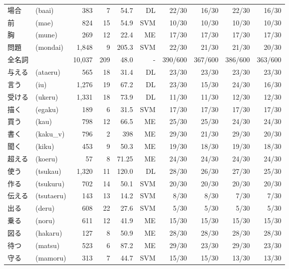 \begin{table*}[htbp]
\begin{center}
\begin{tabular}[c]{|l@{}l|r|r|r|r|@{ }r@{ }r|@{ }r@{ }r|}
      場合 & (baai) & 383 & 7 & 54.7 & DL 
      & 22/30 & 16/30 & 22/30 & 16/30 \\
      前 & (mae) & 824 & 15 & 54.9 & SVM
      & 10/30 & 10/30 & 10/30 & 10/30 \\
      胸 & (mune) & 269 & 12 & 22.4 & ME
      & 17/30 & 17/30 & 17/30 & 17/30 \\
      問題 & (mondai) & 1,848 & 9 & 205.3 & SVM 
      & 22/30 & 21/30 & 21/30 & 20/30 \\
      \hline
      全名詞 & & 10,037 & 209 & 48.0 & - 
      & 390/600 & 367/600 & 386/600 & 363/600 \\
      \hline
      与える & (ataeru) & 565 & 18 & 31.4 & DL
      & 23/30 & 23/30 & 23/30 & 23/30 \\
      言う & (iu) & 1,276 & 19 & 67.2 & DL 
      & 23/30 & 15/30 & 24/30 & 16/30 \\
      受ける & (ukeru) & 1,331 & 18 & 73.9 & DL
      & 11/30 & 11/30 & 12/30 & 12/30 \\
      描く & (egaku) & 189 & 6 & 31.5 & SVM 
      & 17/30 & 17/30 & 17/30 & 17/30 \\
      買う & (kau) & 798 & 12 & 66.5 & ME
      & 25/30 & 25/30 & 24/30 & 24/30 \\
      書く & (kaku\_v) & 796 & 2 & 398 & ME
      & 29/30 & 21/30 & 29/30 & 20/30 \\
      聞く & (kiku) & 453 & 9 & 50.3 & ME
      & 19/30 & 18/30 & 19/30 & 18/30 \\
      超える & (koeru) & 57 & 8 & 71.25 & ME
      & 24/30 & 24/30 & 24/30 & 24/30 \\
      使う & (tsukau) & 1,320 & 11 & 120.0 & DL
      & 28/30 & 26/30 & 27/30 & 25/30 \\
      作る & (tsukuru) & 702 & 14 & 50.1 & SVM
      & 20/30 & 20/30 & 20/30 & 20/30 \\
      伝える & (tsutaeru) & 143 & 13 & 14.2 & SVM
      & 8/30 & 8/30 & 7/30 & 7/30 \\
      出る & (deru) & 608 & 22 & 27.6 & SVM
      & 5/30 & 5/30 & 5/30 & 5/30 \\
      乗る & (noru) & 611 & 12 & 41.9 & ME
      & 15/30 & 15/30 & 15/30 & 15/30 \\
      図る & (hakaru) & 127 & 8 & 50.9 & ME
      & 28/30 & 28/30 & 28/30 & 28/30 \\
      待つ & (matsu) & 523 & 6 & 87.2 & ME
      & 29/30 & 23/30 & 29/30 & 23/30 \\
      守る & (mamoru) & 313 & 7 & 44.7 & SVM 
      & 15/30 & 15/30 & 13/30 & 13/30 \\

\end{tabular}
\end{center}
\end{table*}
